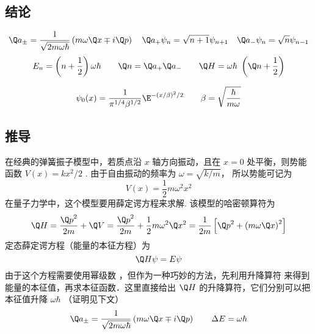 

\subsection{结论}
\begin{equation}
{\Q a_ \pm } = \frac{1}{\sqrt {2m\omega \hbar } }\left( {m\omega \Q x \mp i\Q p} \right)
\quad
{\Q a_ + }{\psi_n} = \sqrt {n + 1}    {\psi_{n + 1}}
\quad
{\Q a_ - }{\psi_n} = \sqrt n    {\psi_{n - 1}}
\end{equation}
\begin{equation}
 {E_n} = \left( {n+\frac12} \right)\omega \hbar
\qquad
\Q n = {\Q a_ + }{\Q a_ - }
\qquad
\Q H = \omega \hbar {\text{ }}\left( {\Q n + \frac12} \right)
\end{equation}

\begin{equation}
\psi_0 (x) = \frac{1}{{\pi ^{1/4}}{\beta ^{1/2}}}{\E^{ - {{(x/\beta )}^2}/2}}  \qquad \beta  = \sqrt {\frac{\hbar }{m\omega }}
\end{equation}

\subsection{推导}
在经典的弹簧振子模型中，若质点沿 $x$ 轴方向振动，且在 $x = 0$ 处平衡，则势能函数 $V\left( x \right) = k{x^2}/{2}$ . 由于自由振动的频率为 $\omega  = \sqrt {{k}/{m}} $， 所以势能可记为
\begin{equation}
  V\left( x \right) = \frac12 m{\omega ^2}{x^2}
\end{equation}
在量子力学中，这个模型要用薛定谔方程来求解. 该模型的哈密顿算符为
\begin{equation}
  \Q H = \frac{{\Q p}^2}{2m} + \Q V = \frac{{\Q p}^2}{2m} + \frac12 m{\omega ^2}{\Q x^2} = \frac{1}{2m}\left[ {{{\Q p}^2} + {{\left( {m\omega \Q x} \right)}^2}} \right]
\end{equation}
定态薛定谔方程（能量的本征方程）为
\begin{equation}\label{QSHOop_eq6}
  \Q H\psi  = E\psi
\end{equation}
由于这个方程需要使用幂级数%
，但作为一种巧妙的方法，先利用升降算符%
来得到能量的本征值，再求本征函数．这里直接给出 $\Q H$ 的升降算符，它们分别可以把本征值升降 $\omega\hbar$ （证明见下文）
\begin{equation}
{\Q a_ \pm } = \frac{1}{\sqrt {2m\omega \hbar } }\left( {m\omega \Q x \mp i\Q p} \right)
\qquad
\Delta E = \omega \hbar
\end{equation}


